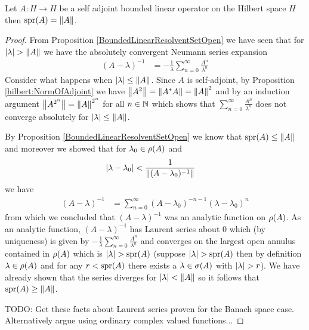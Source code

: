 \begin{prop}\label{hilbert:SpectralRadiusBoundedSelfAdjoint}Let $A : H \to H$ be a self adjoint bounded linear operator on the Hilbert space $H$ then $\operatorname*{spr}(A) = \left \lVert A \right \rVert$.
\end{prop}
\begin{proof}
From Proposition \ref {BoundedLinearResolventSetOpen} we have seen that for $\left \vert \lambda \right \vert > \left \lVert A \right \rVert$ we have the absolutely convergent Neumann series expansion
\begin{align*}
(A - \lambda)^{-1} &= -\frac{1}{\lambda} \sum_{n=0}^\infty \frac{A^n}{\lambda^n}
\end{align*}
Consider what happens when $\left \vert \lambda \right \vert \leq \left \lVert A \right \rVert$.  Since $A$ is self-adjoint, by Proposition \ref{hilbert:NormOfAdjoint} we have $\left \lVert A^2 \right \rVert = \left \lVert {A}^*A \right \rVert = \left \lVert A \right \rVert^2$ and by an induction argument $\left \lVert A^{2^n} \right \rVert = \left \lVert A \right \rVert^{2^n}$ for all $n \in \mathbb{N}$ which shows that $\sum_{n=0}^\infty \frac{A^n}{\lambda^n}$  does not converge absolutely for $\left \vert \lambda \right \vert \leq \left \lVert A \right \rVert$.  

By Proposition \ref {BoundedLinearResolventSetOpen} we know that $\operatorname*{spr}(A) \leq \left \lVert A \right \rVert$ and moreover we showed that for $\lambda_0 \in \rho(A)$ and 
\begin{align*}
\left \vert \lambda - \lambda_0 \right \vert  &< \frac{1}{\left \lVert (A-\lambda_0)^{-1} \right \rVert}
\end{align*}
we have 
\begin{align*}
(A - \lambda)^{-1} &= \sum_{n=0}^\infty (A- \lambda_0)^{-n-1} (\lambda - \lambda_0)^n
\end{align*}
from which we concluded that $(A - \lambda)^{-1}$ was an analytic function on $\rho(A)$.  As an analytic function, $(A - \lambda)^{-1}$ has Laurent series about $0$ which (by uniqueness) is given by $-\frac{1}{\lambda} \sum_{n=0}^\infty \frac{A^n}{\lambda^n}$ and converges on the largest open annulus contained in $\rho(A)$ which is $\left \vert \lambda \right \vert > \operatorname*{spr}(A)$ (suppose $\left \vert \lambda \right \vert >  \operatorname*{spr}(A)$ then by definition  $\lambda \in \rho(A)$ and for any $r < \operatorname*{spr}(A)$ there exists a $\lambda \in \sigma(A)$ with $\left \vert \lambda \right \vert > r$).  We have already shown that the series diverges for $\left \vert \lambda \right \vert < \left \lVert A \right \rVert$ so it follows that $\operatorname*{spr}(A) \geq \left \lVert A \right \rVert$.   

TODO:  Get these facts about Laurent series proven for the Banach space case.  Alternatively argue using ordinary complex valued functions...
\end{proof}

